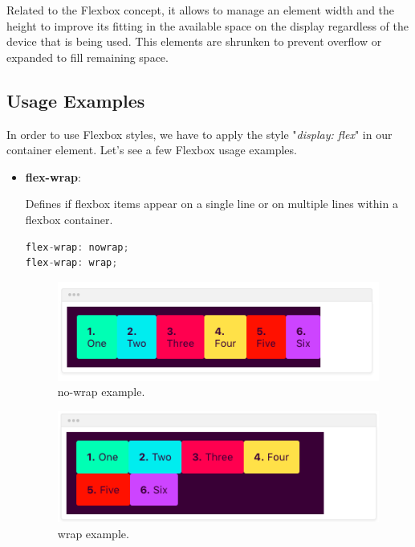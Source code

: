 \documentclass[a4paper, 12pt, english]{book}
\begin{document}
Related to the Flexbox concept, it allows to manage an element width and the height to improve its fitting in the available space on the display regardless of the device that is being used. This elements are shrunken to prevent overflow or expanded to fill remaining space.

\subsection{Usage Examples}
\label{sec:chatjs-examples}

In order to use Flexbox styles, we have to apply the style "\textit{display: flex}" in our container element. Let's see a few Flexbox usage examples.

\begin{itemize}
    \item \textbf{flex-wrap}:

        Defines if flexbox items appear on a single line or on multiple lines within a flexbox container.
        \begin{lstlisting}[language=javascript]
flex-wrap: nowrap;
flex-wrap: wrap;
        \end{lstlisting}
        \begin{figure}
          \centering
          \includegraphics[width=11cm, keepaspectratio]{img/no-wrap-example}
          \caption{no-wrap example.}
          \label{fig:no-wrap-example}
        \end{figure}
        \begin{figure}
          \centering
          \includegraphics[width=11cm, keepaspectratio]{img/wrap-example}
          \caption{wrap example.}
          \label{fig:wrap-example}
        \end{figure}


\end{itemize}
\end{document}
